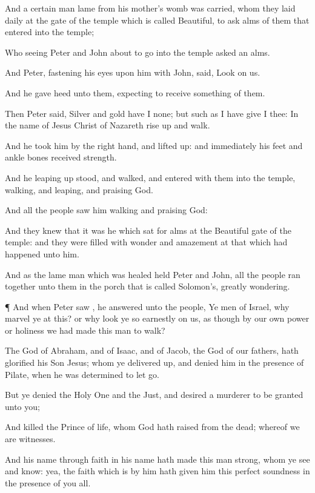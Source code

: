 {And a
certain
man
lame
from
his
mother’s
womb was
carried,
whom they
laid
daily
at the
gate of the
temple
which is
called
Beautiful, to
ask
alms
of
them that
entered
into the
temple;

Who
seeing
Peter
and
John about
to
go
into the
temple
asked an
alms.

And
Peter, fastening his
eyes
upon
him
with
John,
said,
Look
on
us.

And
he gave heed
unto
them,
expecting to
receive
something
of
them.

Then
Peter
said,
Silver
and
gold
have
I
none;
but such
as I
have give
I
thee:
In the
name of
Jesus
Christ of
Nazareth rise
up
and
walk.

And he
took
him
by the
right
hand,
and
lifted
{}
up:
and
immediately
his
feet
and ankle
bones received
strength.

And
he leaping
up
stood,
and
walked,
and
entered
with
them
into the
temple,
walking,
and
leaping,
and
praising
God.

And
all the
people
saw
him
walking
and
praising
God:

And they
knew
that
it
was
he
which
sat
for
alms
at the
Beautiful
gate of the
temple:
and they were
filled with
wonder
and
amazement
at that
which had
happened unto
him.

And as the
lame
man which was
healed
held
Peter
and
John,
all the
people ran
together
unto
them
in the
porch that is
called
Solomon’s, greatly
wondering.


\par }{\PP {}¶
And
when
Peter
saw
{}, he
answered
unto the
people, Ye
men of
Israel,
why marvel
ye
at
this?
or
why look ye so
earnestly on
us,
as though by
our
own
power
or
holiness we had
made
this
man to
walk?

The
God of
Abraham,
and of
Isaac,
and of
Jacob, the
God of
our
fathers, hath
glorified
his
Son
Jesus;
whom
ye delivered
up,
and
denied
him
in the
presence of
Pilate,
when
he was
determined to
let
{}
go.

But
ye
denied the Holy
One
and the
Just,
and
desired a
murderer to be
granted unto
you;

And
killed the
Prince of
life,
whom
God hath
raised
from the
dead;
whereof
we
are
witnesses.

And
his
name
through
faith
in
his
name hath
made this
man
strong,
whom ye
see
and
know:
yea, the
faith
which is
by
him hath
given
him
this perfect
soundness in the
presence of
you
all.

}
